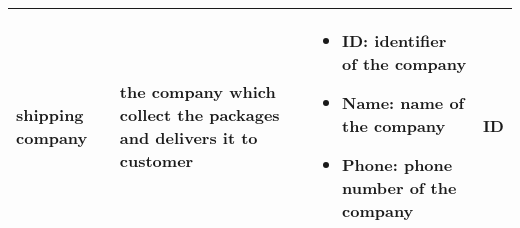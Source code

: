 \begin{longtable}{|p{}|p{} |p{}|p{} |}
 
    shipping company & the company which collect the packages and delivers it to customer & \begin{itemize}
        \vspace{-1em}
        \item ID: identifier of the company
        \item Name: name of the company
        \item Phone: phone number of the company
    \end{itemize}
 &  ID \\\hline
 
\end{longtable}
